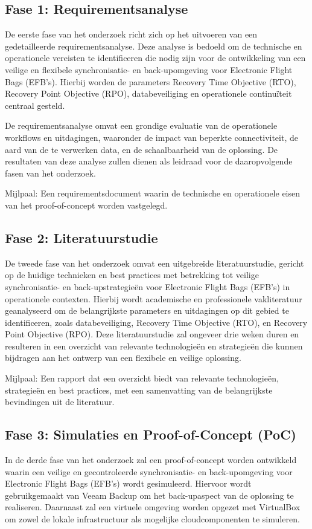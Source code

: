 \subsection{Fase 1: Requirementsanalyse}
De eerste fase van het onderzoek richt zich op het uitvoeren van een gedetailleerde requirementsanalyse. Deze analyse is bedoeld om de technische en operationele vereisten te identificeren die nodig zijn voor de ontwikkeling van een veilige en flexibele synchronisatie- en back-upomgeving voor Electronic Flight Bags (EFB's). Hierbij worden de parameters Recovery Time Objective (RTO), Recovery Point Objective (RPO), databeveiliging en operationele continuïteit centraal gesteld.

De requirementsanalyse omvat een grondige evaluatie van de operationele workflows en uitdagingen, waaronder de impact van beperkte connectiviteit, de aard van de te verwerken data, en de schaalbaarheid van de oplossing. De resultaten van deze analyse zullen dienen als leidraad voor de daaropvolgende fasen van het onderzoek.

Mijlpaal: Een requirementsdocument waarin de technische en operationele eisen van het proof-of-concept worden vastgelegd.

\subsection{Fase 2: Literatuurstudie}
De tweede fase van het onderzoek omvat een uitgebreide literatuurstudie, gericht op de huidige technieken en best practices met betrekking tot veilige synchronisatie- en back-upstrategieën voor Electronic Flight Bags (EFB's) in operationele contexten. Hierbij wordt academische en professionele vakliteratuur geanalyseerd om de belangrijkste parameters en uitdagingen op dit gebied te identificeren, zoals databeveiliging, Recovery Time Objective (RTO), en Recovery Point Objective (RPO). Deze literatuurstudie zal ongeveer drie weken duren en resulteren in een overzicht van relevante technologieën en strategieën die kunnen bijdragen aan het ontwerp van een flexibele en veilige oplossing.

Mijlpaal: Een rapport dat een overzicht biedt van relevante technologieën, strategieën en best practices, met een samenvatting van de belangrijkste bevindingen uit de literatuur.

\subsection{Fase 3: Simulaties en Proof-of-Concept (PoC)}
In de derde fase van het onderzoek zal een proof-of-concept worden ontwikkeld waarin een veilige en gecontroleerde synchronisatie- en back-upomgeving voor Electronic Flight Bags (EFB's) wordt gesimuleerd. Hiervoor wordt gebruikgemaakt van Veeam Backup om het back-upaspect van de oplossing te realiseren. Daarnaast zal een virtuele omgeving worden opgezet met VirtualBox om zowel de lokale infrastructuur als mogelijke cloudcomponenten te simuleren.

